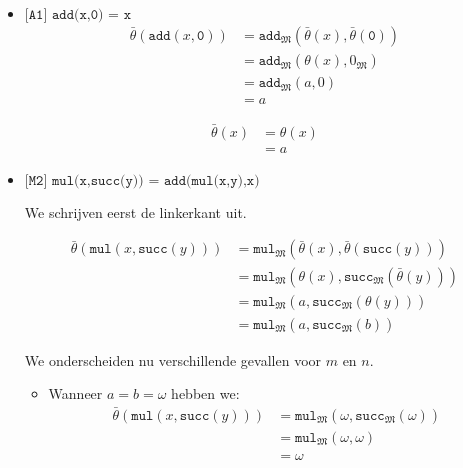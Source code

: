 \documentclass[a4paper,11pt]{article}
\begin{document}
\begin{itemize}

\item{$\texttt{[A1] add(x,0) = x}$}
\begin{align*}
\bar \theta(\texttt{add}(x,\texttt{0})) &= \texttt{add}_{\mathfrak{M}}(\bar \theta(x), \bar \theta(\texttt{0})) \\
                                        &= \texttt{add}_{\mathfrak{M}}(\theta(x), 0_{\mathfrak{M}}) \\
                                        &= \texttt{add}_{\mathfrak{M}}(a, 0) \\
                                        &= a
\end{align*}

\begin{align*}
\bar \theta(x) &= \theta(x) \\
               &= a
\end{align*}

\item{$\texttt{[M2] mul(x,succ(y)) = add(mul(x,y),x)}$}

We schrijven eerst de linkerkant uit.

\begin{align*}
\bar \theta(\texttt{mul}(x,\texttt{succ}(y))) &= \texttt{mul}_{\mathfrak{M}}(\bar \theta(x), \bar \theta(\texttt{succ}(y))) \\
                                              &= \texttt{mul}_{\mathfrak{M}}(\theta(x), \texttt{succ}_{\mathfrak{M}}(\bar \theta(y))) \\
                                              &= \texttt{mul}_{\mathfrak{M}}(a, \texttt{succ}_{\mathfrak{M}}(\theta(y))) \\
                                              &= \texttt{mul}_{\mathfrak{M}}(a, \texttt{succ}_{\mathfrak{M}}(b))
\end{align*}

We onderscheiden nu verschillende gevallen voor $m$ en $n$.

\begin{itemize}

\item
Wanneer $a = b = \omega$ hebben we:
\begin{align*}
\bar \theta(\texttt{mul}(x,\texttt{succ}(y))) &= \texttt{mul}_{\mathfrak{M}}(\omega, \texttt{succ}_{\mathfrak{M}}(\omega)) \\
                                              &= \texttt{mul}_{\mathfrak{M}}(\omega, \omega) \\
                                              &= \omega
\end{align*}


\end{itemize}
\end{itemize}
\end{document}

